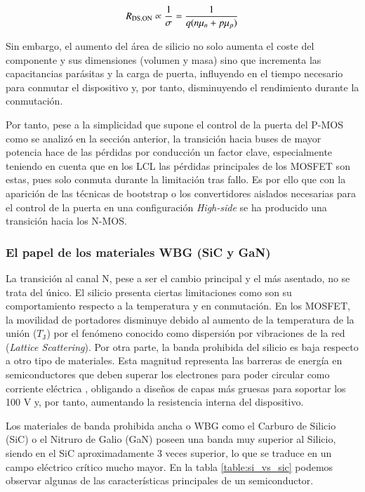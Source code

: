 \documentclass[12pt]{report} %
\begin{document}
\begin{equation}
R_{\text{DS,ON}}\propto \frac{1}{\sigma} = \frac{1}{q (n\mu_n + p\mu_p)}
\label{eq:conductividad}
\end{equation}

Sin embargo, el aumento del área de silicio no solo aumenta el coste del componente y sus dimensiones (volumen y masa) sino que incrementa las capacitancias parásitas y la carga de puerta, influyendo en el tiempo necesario para conmutar el dispositivo y, por tanto, disminuyendo el rendimiento durante la conmutación. 

Por tanto, pese a la simplicidad que supone el control de la puerta del P-MOS como se analizó en la sección anterior, la transición hacia buses de mayor potencia hace de las pérdidas por conducción un factor clave, especialmente teniendo en cuenta que en los LCL las pérdidas principales de los MOSFET son estas, pues solo conmuta durante la limitación tras fallo. Es por ello que con la aparición de las técnicas de bootstrap o los convertidores aislados necesarias para el control de la puerta en una configuración \textit{High-side} se ha producido una transición hacia los N-MOS.

\subsubsection{El papel de los materiales WBG (SiC y GaN)}
La transición al canal N, pese a ser el cambio principal y el más asentado, no se trata del único. El silicio presenta ciertas limitaciones como son su comportamiento respecto a la temperatura y en conmutación. En los MOSFET, la movilidad de portadores disminuye debido al aumento de la temperatura de la unión ($T_\text{J}$) por el fenómeno conocido como dispersión por vibraciones de la red (\textit{Lattice Scattering})\cite{ridley_quantum_2013}.
Por otra parte, la banda prohibida del silicio es baja respecto a otro tipo de materiales. Esta magnitud representa las barreras de energía en semiconductores que deben superar los electrones para poder circular como corriente eléctrica \cite{noauthor_materiales_nodate}, obligando a diseños de capas más gruesas para soportar los 100 V y, por tanto, aumentando la resistencia interna del dispositivo.

Los materiales de banda prohibida ancha o WBG como el Carburo de Silicio (SiC) o el Nitruro de Galio (GaN) poseen una banda muy superior al Silicio, siendo en el SiC aproximadamente 3 veces superior, lo que se traduce en un campo eléctrico crítico mucho mayor. En la tabla \ref{table:si_vs_sic} podemos observar algunas de las características principales de un semiconductor.
\end{document}
